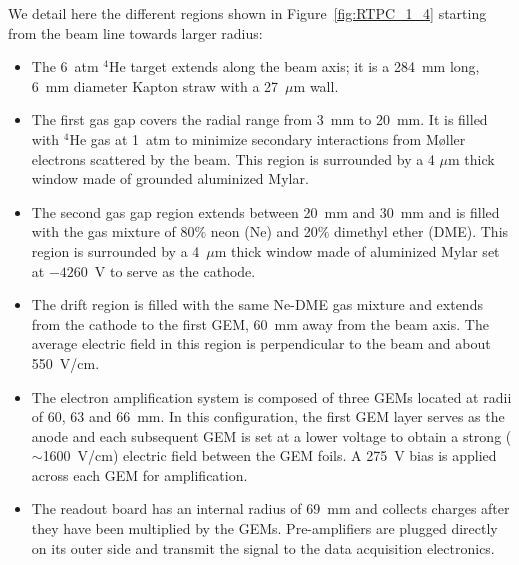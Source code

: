 \documentclass[preprint,5p]{elsarticle}
\begin{document}
We detail here the different regions shown in Figure~\ref{fig:RTPC_1_4} 
starting from the beam line towards larger radius:\\
\begin{itemize}
  \item The 6~atm $^4$He target extends along the beam axis; it is a 284~mm 
     long, 6~mm diameter Kapton straw with a 27~$\mu$m wall.
   \item The first gas gap covers the radial range from 3~mm to 20~mm. It is 
      filled with $^{4}$He gas at 1~atm to minimize secondary interactions from
      M\o{}ller electrons scattered by the beam. This region is surrounded by 
      a 4 $\mu$m thick window made of grounded aluminized Mylar.
   \item The second gas gap region extends between 20~mm and 30~mm and is 
      filled with the gas mixture of 80$\%$ neon (Ne) and 20$\%$ dimethyl ether 
      (DME).  This region is surrounded by a 4~$\mu$m thick window made of 
      aluminized Mylar set at $-4260$~V to serve as the cathode.
   \item The drift region is filled with the same Ne-DME gas mixture and 
      extends from the cathode to the first GEM, 60~mm away from the beam axis.  
      The average electric field in this region is perpendicular to the beam 
      and about 550~V/cm.
   \item The electron amplification system is composed of three GEMs located at 
      radii of 60, 63 and 66~mm. In this configuration, the first GEM layer 
      serves as the anode and each subsequent GEM is set at a lower voltage to
      obtain a strong ($\sim$1600~V/cm) electric field between the GEM foils. A 
      275~V bias is applied across each GEM for amplification.
   \item The readout board has an internal radius of 69~mm and collects charges 
      after they have been multiplied by the GEMs. Pre-amplifiers are plugged 
      directly on its outer side and transmit the signal to the data 
      acquisition electronics.
\end{itemize}
\end{document}

